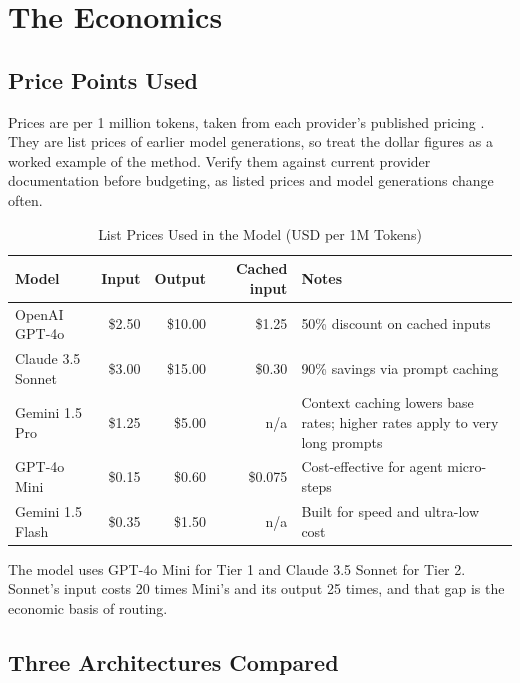 \documentclass[conference]{IEEEtran}
\begin{document}
\section{The Economics}
\label{sec:econ}

\subsection{Price Points Used}
\label{sec:prices}

Prices are per 1 million tokens, taken from each provider's published pricing \cite{openai,anthropic,google}. They are list prices of earlier model generations, so treat the dollar figures as a worked example of the method. Verify them against current provider documentation before budgeting, as listed prices and model generations change often.

\begin{table}[!t]
\caption{List Prices Used in the Model (USD per 1M Tokens)}
\label{tab:prices}
\centering
\footnotesize
\begin{tabularx}{\textwidth}{@{}l r r r Y@{}}
\toprule
\textbf{Model} & \textbf{Input} & \textbf{Output} & \textbf{Cached input} & \textbf{Notes} \\
\midrule
OpenAI GPT-4o & \$2.50 & \$10.00 & \$1.25 & 50\% discount on cached inputs \\
Claude 3.5 Sonnet & \$3.00 & \$15.00 & \$0.30 & 90\% savings via prompt caching \\
Gemini 1.5 Pro & \$1.25 & \$5.00 & n/a & Context caching lowers base rates; higher rates apply to very long prompts \\
GPT-4o Mini & \$0.15 & \$0.60 & \$0.075 & Cost-effective for agent micro-steps \\
Gemini 1.5 Flash & \$0.35 & \$1.50 & n/a & Built for speed and ultra-low cost \\
\bottomrule
\end{tabularx}
\end{table}

The model uses GPT-4o Mini for Tier 1 and Claude 3.5 Sonnet for Tier 2. Sonnet's input costs 20 times Mini's and its output 25 times, and that gap is the economic basis of routing.

\subsection{Three Architectures Compared}
\label{sec:three}
\end{document}
